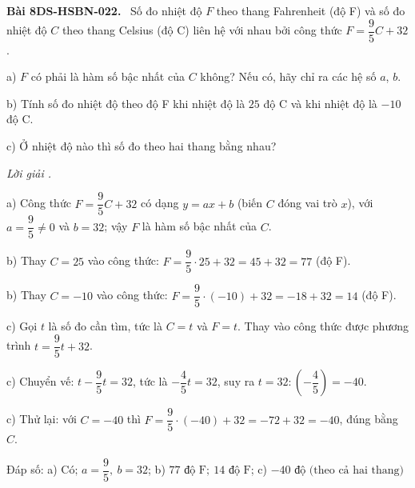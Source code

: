 \documentclass[12pt,a4paper]{article}
\newenvironment{problem}[1][]{\par\medskip\noindent\textbf{Bài #1.}\ }{\par}
\newenvironment{solution}[1][]{\par\noindent\textit{Lời giải #1.}\par}{\par}
\begin{document}
\begin{problem}[8DS-HSBN-022]
Số đo nhiệt độ $F$ theo thang Fahrenheit (độ F) và số đo nhiệt độ $C$ theo thang Celsius (độ C) liên hệ với nhau bởi công thức $F = \dfrac{9}{5}C + 32$.

a) $F$ có phải là hàm số bậc nhất của $C$ không? Nếu có, hãy chỉ ra các hệ số $a$, $b$.

b) Tính số đo nhiệt độ theo độ F khi nhiệt độ là $25$ độ C và khi nhiệt độ là $-10$ độ C.

c) Ở nhiệt độ nào thì số đo theo hai thang bằng nhau?

\begin{solution}
a) Công thức $F = \dfrac{9}{5}C + 32$ có dạng $y = ax + b$ (biến $C$ đóng vai trò $x$), với $a = \dfrac{9}{5} \neq 0$ và $b = 32$; vậy $F$ là hàm số bậc nhất của $C$.

b) Thay $C = 25$ vào công thức: $F = \dfrac{9}{5} \cdot 25 + 32 = 45 + 32 = 77$ (độ F).

b) Thay $C = -10$ vào công thức: $F = \dfrac{9}{5} \cdot (-10) + 32 = -18 + 32 = 14$ (độ F).

c) Gọi $t$ là số đo cần tìm, tức là $C = t$ và $F = t$. Thay vào công thức được phương trình $t = \dfrac{9}{5}t + 32$.

c) Chuyển vế: $t - \dfrac{9}{5}t = 32$, tức là $-\dfrac{4}{5}t = 32$, suy ra $t = 32 : \left(-\dfrac{4}{5}\right) = -40$.

c) Thử lại: với $C = -40$ thì $F = \dfrac{9}{5} \cdot (-40) + 32 = -72 + 32 = -40$, đúng bằng $C$.

Đáp số: a) $\boxed{\text{Có; } a = \dfrac{9}{5},\ b = 32}$; b) $\boxed{77 \text{ độ F};\ 14 \text{ độ F}}$; c) $\boxed{-40 \text{ độ (theo cả hai thang)}}$
\end{solution}
\end{problem}
\end{document}
